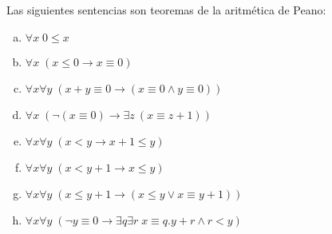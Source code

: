   \begin{lemma} \label{lemma_93}
    \PN Las siguientes sentencias son teoremas de la aritmética de Peano:
    \begin{multicols}{2}
      \begin{enumerate}[(a)]
        \item $\forall x \; 0 \leq x$
        \item $\forall x \; (x \leq 0 \rightarrow x \equiv 0)$
        \item $\forall x \forall y \; (x + y \equiv 0 \rightarrow (x \equiv 0 \wedge y \equiv 0))$
        \item $\forall x \; (\lnot (x \equiv 0) \rightarrow \exists z \ (x \equiv z + 1))$
        \item $\forall x \forall y \; (x < y \rightarrow x + 1 \leq y)$
        \item $\forall x \forall y \; (x < y + 1 \rightarrow x \leq y)$
        \item $\forall x \forall y \; (x \leq y+1 \rightarrow (x \leq y \vee x \equiv y+1))$
        \item $\forall x \forall y \; (\lnot y \equiv 0 \rightarrow \exists q \exists r \; x \equiv q.y+r \wedge r < y)$
      \end{enumerate}
    \end{multicols}
  \end{lemma}
